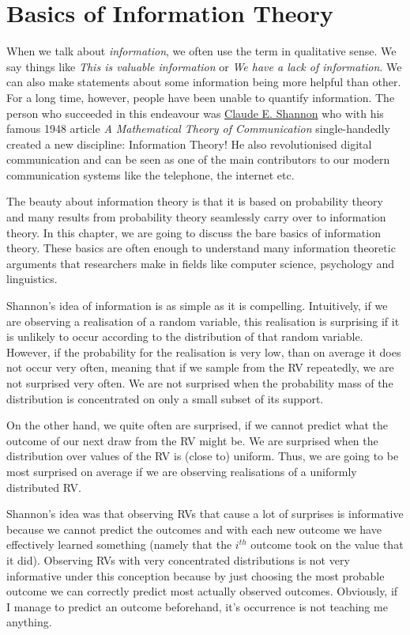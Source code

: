 \section{Basics of Information Theory}

When we talk about \textit{information}, we often use the term in qualitative sense. We say things like 
\textit{This is valuable information} or 
\textit{We have a lack of information}. We can also make statements about some information being more helpful than other. For a long time, however,
people have been unable to quantify information. The person who succeeded in this endeavour was \href{https://en.wikipedia.org/wiki/Claude_Shannon}{Claude E. Shannon}
who with his famous 1948 article \textit{A Mathematical Theory of Communication} single-handedly created a new discipline: Information Theory! He also revolutionised
digital communication and can be seen as one of the main contributors to our modern communication systems like the telephone, the internet etc. 

The beauty about information theory is that it is based on probability theory and many results from probability theory seamlessly carry over to information theory.
In this chapter, we are going to discuss the bare basics of information theory. These basics are often enough to understand many information theoretic arguments
that researchers make in fields like computer science, psychology and linguistics.

Shannon's idea of information is as simple as it is compelling. Intuitively, if we are observing a realisation of a random variable, this realisation is surprising
if it is unlikely to occur according to the distribution of that random variable. However, if the probability for the realisation is very low, than on average it
does not occur very often, meaning that if we sample from the RV repeatedly, we are not surprised very often. We are not surprised when the probability
mass of the distribution is concentrated on only a small subset of its support. 

On the other hand, we quite often are surprised,
if we cannot predict what the outcome of our next draw from the RV might be. We are surprised when the distribution over values of the RV is (close to) uniform. Thus,
we are going to be most surprised on average if we are observing realisations of a uniformly distributed RV.

Shannon's idea was that observing RVs that cause a lot of surprises is informative because we cannot predict the outcomes and with each new outcome we have effectively
learned something  (namely that the $ i^{th} $ outcome took on the value that it did). Observing RVs with very concentrated distributions is not very informative
under this conception because by just choosing the most probable outcome we can correctly predict most actually observed outcomes. Obviously, if I manage to predict
an outcome beforehand, it's occurrence is not teaching me anything.

